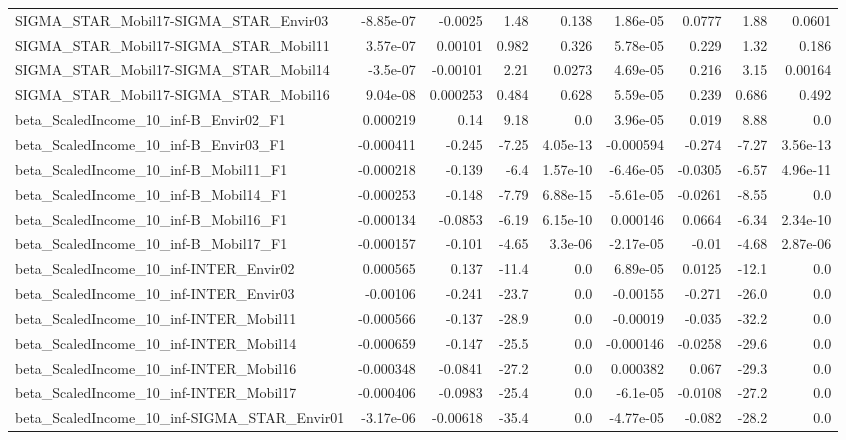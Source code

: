 \begin{tabular}{lrrrrrrrr}
SIGMA_STAR_Mobil17-SIGMA_STAR_Envir03 & -8.85e-07 & -0.0025 & 1.48 & 0.138 & 1.86e-05 & 0.0777 & 1.88 & 0.0601 \\
SIGMA_STAR_Mobil17-SIGMA_STAR_Mobil11 & 3.57e-07 & 0.00101 & 0.982 & 0.326 & 5.78e-05 & 0.229 & 1.32 & 0.186 \\
SIGMA_STAR_Mobil17-SIGMA_STAR_Mobil14 & -3.5e-07 & -0.00101 & 2.21 & 0.0273 & 4.69e-05 & 0.216 & 3.15 & 0.00164 \\
SIGMA_STAR_Mobil17-SIGMA_STAR_Mobil16 & 9.04e-08 & 0.000253 & 0.484 & 0.628 & 5.59e-05 & 0.239 & 0.686 & 0.492 \\
beta_ScaledIncome_10_inf-B_Envir02_F1 & 0.000219 & 0.14 & 9.18 & 0.0 & 3.96e-05 & 0.019 & 8.88 & 0.0 \\
beta_ScaledIncome_10_inf-B_Envir03_F1 & -0.000411 & -0.245 & -7.25 & 4.05e-13 & -0.000594 & -0.274 & -7.27 & 3.56e-13 \\
beta_ScaledIncome_10_inf-B_Mobil11_F1 & -0.000218 & -0.139 & -6.4 & 1.57e-10 & -6.46e-05 & -0.0305 & -6.57 & 4.96e-11 \\
beta_ScaledIncome_10_inf-B_Mobil14_F1 & -0.000253 & -0.148 & -7.79 & 6.88e-15 & -5.61e-05 & -0.0261 & -8.55 & 0.0 \\
beta_ScaledIncome_10_inf-B_Mobil16_F1 & -0.000134 & -0.0853 & -6.19 & 6.15e-10 & 0.000146 & 0.0664 & -6.34 & 2.34e-10 \\
beta_ScaledIncome_10_inf-B_Mobil17_F1 & -0.000157 & -0.101 & -4.65 & 3.3e-06 & -2.17e-05 & -0.01 & -4.68 & 2.87e-06 \\
beta_ScaledIncome_10_inf-INTER_Envir02 & 0.000565 & 0.137 & -11.4 & 0.0 & 6.89e-05 & 0.0125 & -12.1 & 0.0 \\
beta_ScaledIncome_10_inf-INTER_Envir03 & -0.00106 & -0.241 & -23.7 & 0.0 & -0.00155 & -0.271 & -26.0 & 0.0 \\
beta_ScaledIncome_10_inf-INTER_Mobil11 & -0.000566 & -0.137 & -28.9 & 0.0 & -0.00019 & -0.035 & -32.2 & 0.0 \\
beta_ScaledIncome_10_inf-INTER_Mobil14 & -0.000659 & -0.147 & -25.5 & 0.0 & -0.000146 & -0.0258 & -29.6 & 0.0 \\
beta_ScaledIncome_10_inf-INTER_Mobil16 & -0.000348 & -0.0841 & -27.2 & 0.0 & 0.000382 & 0.067 & -29.3 & 0.0 \\
beta_ScaledIncome_10_inf-INTER_Mobil17 & -0.000406 & -0.0983 & -25.4 & 0.0 & -6.1e-05 & -0.0108 & -27.2 & 0.0 \\
beta_ScaledIncome_10_inf-SIGMA_STAR_Envir01 & -3.17e-06 & -0.00618 & -35.4 & 0.0 & -4.77e-05 & -0.082 & -28.2 & 0.0 \\

\end{tabular}
